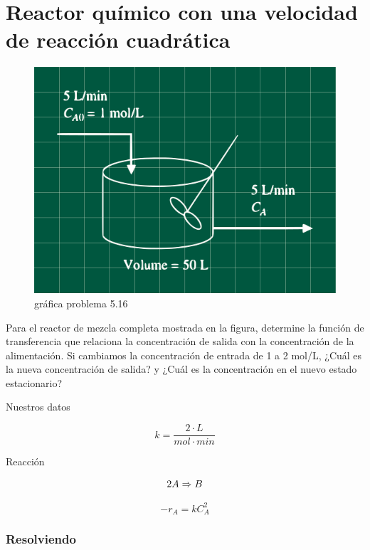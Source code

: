 \documentclass[
  letterpaper,
  DIV=11,
  numbers=noendperiod]{scrreprt}
\begin{document}
\hypertarget{reactor-quuxedmico-con-una-velocidad-de-reacciuxf3n-cuadruxe1tica}{%
\chapter{Reactor químico con una velocidad de reacción
cuadrática}\label{reactor-quuxedmico-con-una-velocidad-de-reacciuxf3n-cuadruxe1tica}}

\begin{figure}

{\centering \includegraphics{././images/p5.16-coughanowr/headercontrol516.png}

}

\caption{gráfica problema 5.16}

\end{figure}

Para el reactor de mezcla completa mostrada en la figura, determine la
función de transferencia que relaciona la concentración de salida con la
concentración de la alimentación. Si cambiamos la concentración de
entrada de 1 a 2 mol/L, ¿Cuál es la nueva concentración de salida? y
¿Cuál es la concentración en el nuevo estado estacionario?

Nuestros datos

\[
k = \frac{2\cdot L}{mol\cdot min}
\]

Reacción

\[
2A\Rightarrow B\\
\]

\[
-r_A=kC_A^2
\]

\hypertarget{resolviendo-2}{%
\subsection{Resolviendo}\label{resolviendo-2}}
\end{document}
